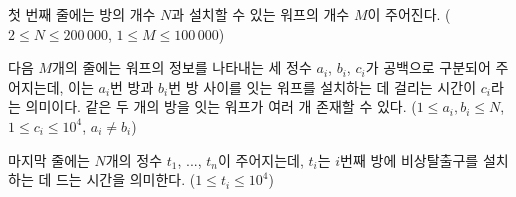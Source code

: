 첫 번째 줄에는 방의 개수 $N$과 설치할 수 있는 워프의 개수 $M$이 주어진다. ($2 \le N \le 200\,000$, $1 \le M \le 100\,000$)

다음 $M$개의 줄에는 워프의 정보를 나타내는 세 정수 $a_i$, $b_i$, $c_i$가 공백으로 구분되어 주어지는데, 이는 $a_i$번 방과 $b_i$번 방 사이를 잇는 워프를 설치하는 데 걸리는 시간이 $c_i$라는 의미이다. 같은 두 개의 방을 잇는 워프가 여러 개 존재할 수 있다. ($1 \le a_i, b_i \le N$, $1 \le c_i \le 10^4$, $a_i \ne b_i$)

마지막 줄에는 $N$개의 정수 $t_1$, ..., $t_n$이 주어지는데, $t_i$는 $i$번째 방에 비상탈출구를 설치하는 데 드는 시간을 의미한다. ($1 \le t_i \le 10^4$)